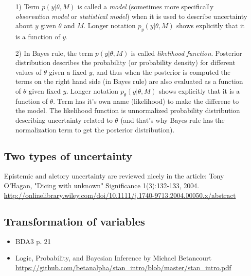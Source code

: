 \documentclass[a4paper,11pt,english]{article}
\begin{document}
\begin{itemize}
\item[1)] Term $p(y|\theta,M)$ is called a \emph{model} (sometimes
  more specifically \emph{observation model} or \emph{statistical
    model}) when it is used to describe uncertainty about $y$ given
  $\theta$ and $M$. Longer notation $p_y(y|\theta,M)$ shows explicitly
  that it is a function of $y$.

\item[2)] In Bayes rule, the term $p(y|\theta,M)$ is called
  \emph{likelihood function}. Posterior distribution describes the
  probability (or probability density) for different values of
  $\theta$ given a fixed $y$, and thus when the posterior is computed
  the terms on the right hand side (in Bayes rule) are also evaluated
  as a function of $\theta$ given fixed $y$. Longer notation
  $p_\theta(y|\theta,M)$ shows explicitly that it is a function of
  $\theta$. Term has it's own name (likelihood) to make the differene
  to the model. The likelihood function is unnormalized probability
  distribution describing uncertainty related to $\theta$ (and that's
  why Bayes rule has the normalization term to get the posterior
  distribution).
\end{itemize}

\subsection*{Two types of uncertainty}

Epistemic and aletory uncertainty are reviewed nicely in the article:
Tony O'Hagan, "Dicing with unknown"
Significance 1(3):132-133, 2004. \url{http://onlinelibrary.wiley.com/doi/10.1111/j.1740-9713.2004.00050.x/abstract}

\subsection*{Transformation of variables}

  \begin{itemize}
  \item BDA3 p. 21
  \item Logic, Probability, and Bayesian Inference by Michael Betancourt
    \url{https://github.com/betanalpha/stan_intro/blob/master/stan_intro.pdf}
  \end{itemize}
\end{document}
